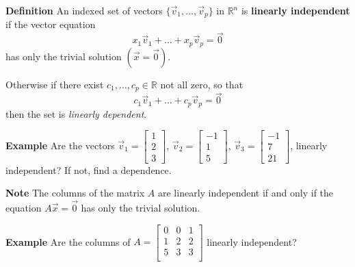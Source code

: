   \begin{frame}[fragile]
\textbf{Definition}  An indexed set of vectors 
$\{ \vec{v}_1, \dots , \vec{v}_p \}$ in $\mathbb R^n$ is \textbf{linearly independent}
if the vector equation 
\[
 x_1 \vec{v}_1 + \dots + x_p \vec{v}_p = \vec{0}
\]
has only the trivial solution $(\vec{x} = \vec{0})$.

Otherwise if there exist $c_1,\dots, c_p \in \mathbb R$ not all zero, so that 
\[
 c_1 \vec{v}_1 + \dots + c_p \vec{v}_p = \vec{0}
\]
then the set is {\em linearly dependent}.

\end{frame}

  \begin{frame}[fragile]
\textbf{Example}
 Are the vectors 
$\vec{v}_1 = \left[\begin{array}{r} 1 \\2 \\3 \end{array}\right] $, 
$\vec{v}_2 = \left[\begin{array}{r} -1 \\ 1 \\ 5 \end{array}\right] $, 
$\vec{v}_3 = \left[\begin{array}{r} -1 \\ 7 \\ 21 \end{array}\right] $, 
linearly independent?  If not, find a dependence.

\end{frame}

  \begin{frame}[fragile]
\textbf{Note}
The columns of the matrix $A$ are linearly independent if and 
only if the equation $A \vec{x} = \vec{0}$ has only the trivial solution.


\textbf{Example}
Are the columns of $A = 
\left[\begin{array}{rrr}
 0 & 0 & 1 \\ 
 1 & 2 & 2 \\
 5 & 3 & 3 \\
\end{array}\right]
$
linearly independent?

\end{frame}

